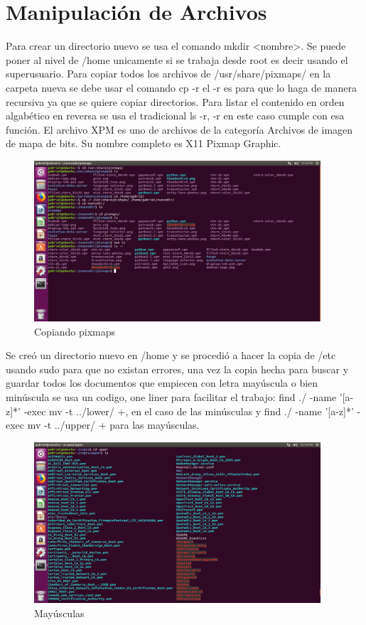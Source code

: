 \documentclass[
  letterpaper, 
  maincolor=black,
  sectioncolor=black!90,
  subsectioncolor=black!70,
  itemtextcolor=black!40,
]{fortysecondscv}
\begin{document}
\section{Manipulación de Archivos}
    Para crear un directorio nuevo se usa el comando mkdir <nombre>. Se puede poner al nivel de /home unicamente si se trabaja desde root es decir usando el superusuario. Para copiar todos los archivos de /usr/share/pixmaps/ en la carpeta nueva se debe usar el comando cp -r el -r es para que lo haga de manera recursiva ya que se quiere copiar directorios. Para listar el contenido en orden algabético en reversa se usa el tradicional ls -r, -r en este caso cumple con esa función. El archivo XPM es uno de archivos de la categoría Archivos de imagen de mapa de bits. Su nombre completo es X11 Pixmap Graphic.
        \begin{figure}[H]
            \centering
            \includegraphics[trim= 0 200 250 0,clip,width=0.95\textwidth]{img/cp.jpg}
            \caption{Copiando pixmaps}
            \label{fig:my_label}
        \end{figure}
    Se creó un directorio nuevo en /home y se procedió a hacer la copia de /etc usando sudo para que no existan errores, una vez la copia hecha para buscar y guardar todos los documentos que empiecen con letra mayúscula o bien minúscula se usa un codigo, one liner para facilitar el trabajo: find ./ -name '[a-z]*' -exec mv -t ../lower/ {} +, en el caso de las minúsculas y find ./ -name '[a-z]*' -exec mv -t ../upper/ {} + para las mayúsculas.
        \begin{figure}[H]
                \centering
                \includegraphics[trim= 0 550 350 0,clip,width=0.95\textwidth]{img/upper.jpg}
                \caption{Mayúsculas}
                \label{fig:my_label}
        \end{figure}
\end{document}
